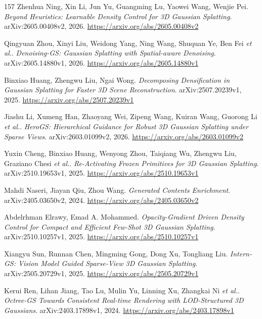 \documentclass[11pt,a4paper]{article}
\begin{document}
\begin{thebibliography}{157}
Zhenhua Ning, Xin Li, Jun Yu, Guangming Lu, Yaowei Wang, Wenjie Pei.
\newblock \emph{Beyond Heuristics: Learnable Density Control for 3D Gaussian Splatting}.
\newblock arXiv:2605.00408v2, 2026.
\newblock \url{https://arxiv.org/abs/2605.00408v2}

Qingyuan Zhou, Xinyi Liu, Weidong Yang, Ning Wang, Shuquan Ye, Ben Fei \emph{et al.}.
\newblock \emph{Denoising-GS: Gaussian Splatting with Spatial-aware Denoising}.
\newblock arXiv:2605.14880v1, 2026.
\newblock \url{https://arxiv.org/abs/2605.14880v1}

Binxiao Huang, Zhengwu Liu, Ngai Wong.
\newblock \emph{Decomposing Densification in Gaussian Splatting for Faster 3D Scene Reconstruction}.
\newblock arXiv:2507.20239v1, 2025.
\newblock \url{https://arxiv.org/abs/2507.20239v1}

Jiashu Li, Xumeng Han, Zhaoyang Wei, Zipeng Wang, Kuiran Wang, Guorong Li \emph{et al.}.
\newblock \emph{HeroGS: Hierarchical Guidance for Robust 3D Gaussian Splatting under Sparse Views}.
\newblock arXiv:2603.01099v2, 2026.
\newblock \url{https://arxiv.org/abs/2603.01099v2}

Yuxin Cheng, Binxiao Huang, Wenyong Zhou, Taiqiang Wu, Zhengwu Liu, Graziano Chesi \emph{et al.}.
\newblock \emph{Re-Activating Frozen Primitives for 3D Gaussian Splatting}.
\newblock arXiv:2510.19653v1, 2025.
\newblock \url{https://arxiv.org/abs/2510.19653v1}

Mahdi Naseri, Jiayan Qiu, Zhou Wang.
\newblock \emph{Generated Contents Enrichment}.
\newblock arXiv:2405.03650v2, 2024.
\newblock \url{https://arxiv.org/abs/2405.03650v2}

Abdelrhman Elrawy, Emad A. Mohammed.
\newblock \emph{Opacity-Gradient Driven Density Control for Compact and Efficient Few-Shot 3D Gaussian Splatting}.
\newblock arXiv:2510.10257v1, 2025.
\newblock \url{https://arxiv.org/abs/2510.10257v1}

Xiangyu Sun, Runnan Chen, Mingming Gong, Dong Xu, Tongliang Liu.
\newblock \emph{Intern-GS: Vision Model Guided Sparse-View 3D Gaussian Splatting}.
\newblock arXiv:2505.20729v1, 2025.
\newblock \url{https://arxiv.org/abs/2505.20729v1}

Kerui Ren, Lihan Jiang, Tao Lu, Mulin Yu, Linning Xu, Zhangkai Ni \emph{et al.}.
\newblock \emph{Octree-GS Towards Consistent Real-time Rendering with LOD-Structured 3D Gaussians}.
\newblock arXiv:2403.17898v1, 2024.
\newblock \url{https://arxiv.org/abs/2403.17898v1}


\end{thebibliography}
\end{document}
